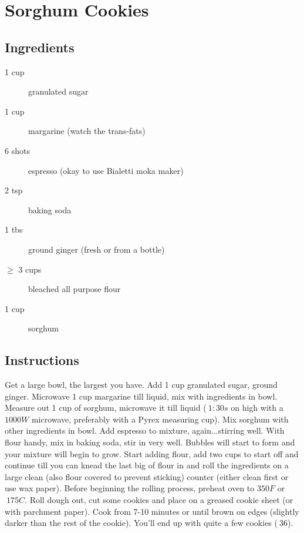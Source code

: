 \section{Sorghum Cookies}
\subsection{Ingredients}
\begin{description}
\item[1 cup] granulated sugar
\item[1 cup] margarine (watch the trans-fats)
\item[6 shots] espresso (okay to use Bialetti moka maker)
\item[2 tsp] baking soda
\item[1 tbs] ground ginger (fresh or from a bottle)
\item[$\ge$ 3 cups] bleached all purpose flour
\item[1 cup] sorghum
\end{description}
\subsection{Instructions}
Get a large bowl, the largest you have.  Add 1 cup granulated sugar,
ground ginger.  Microwave 1 cup margarine till liquid, mix with 
ingredients in bowl.  Measure out 1 cup of sorghum, microwave it
till liquid ($~1:30s$ on high with a $1000W$ microwave, preferably with
a Pyrex measuring cup).  Mix sorghum with other ingredients in bowl. 
Add espresso to mixture, again...stirring well.  With flour handy, 
mix in baking soda, stir in very well.  Bubbles will start to form
and your mixture will begin to grow.  Start adding flour, add two 
cups to start off and continue till you can knead the last big of
flour in and roll the ingredients on a large clean (also flour covered
to prevent sticking) counter (either
clean first or use wax paper).  Before beginning the rolling process,
preheat oven to $350F$ or $~175C$.  Roll dough out, cut some cookies
and place on a greased cookie sheet (or with parchment paper).  
Cook from 7-10 minutes or until 
brown on edges (slightly darker than the rest of the cookie).  You'll 
end up with quite a few cookies ($~36$).
